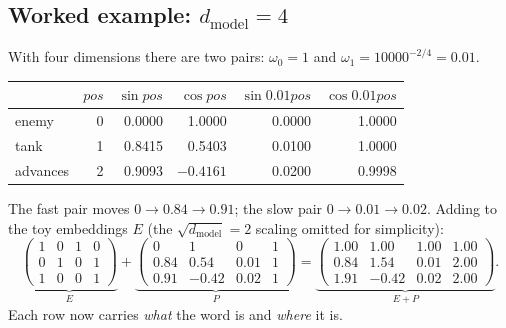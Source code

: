 \documentclass[11pt]{article}
\begin{document}
\subsection{Worked example: $d_{\text{model}}=4$}
With four dimensions there are two pairs: $\omega_0=1$ and $\omega_1=10000^{-2/4}=0.01$.
\begin{center}\small\renewcommand{\arraystretch}{1.2}
\begin{tabular}{lrrrrr}\toprule
 & $pos$ & $\sin pos$ & $\cos pos$ & $\sin0.01pos$ & $\cos0.01pos$\\\midrule
enemy & 0 & 0.0000 & 1.0000 & 0.0000 & 1.0000\\
tank & 1 & 0.8415 & 0.5403 & 0.0100 & 1.0000\\
advances & 2 & 0.9093 & $-0.4161$ & 0.0200 & 0.9998\\\bottomrule
\end{tabular}\end{center}
The fast pair moves $0\to0.84\to0.91$; the slow pair $0\to0.01\to0.02$. Adding to the toy embeddings $E$ (the $\sqrt{d_{\text{model}}}=2$ scaling omitted for simplicity):
\[\underbrace{\begin{pmatrix}1&0&1&0\\0&1&0&1\\1&0&0&1\end{pmatrix}}_{E}+\underbrace{\begin{pmatrix}0&1&0&1\\0.84&0.54&0.01&1\\0.91&-0.42&0.02&1\end{pmatrix}}_{P}=\underbrace{\begin{pmatrix}1.00&1.00&1.00&1.00\\0.84&1.54&0.01&2.00\\1.91&-0.42&0.02&2.00\end{pmatrix}}_{E+P}.\]
Each row now carries \emph{what} the word is and \emph{where} it is.
\end{document}
